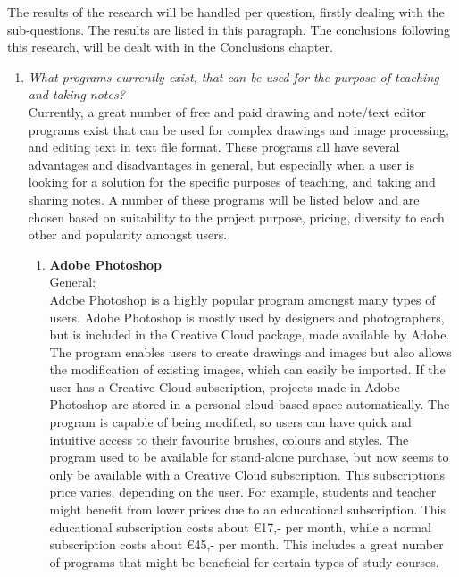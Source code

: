 \documentclass[a4paper,12pt]{article}
\begin{document}
The results of the research will be handled per question, firstly dealing with the sub-questions.
The results are listed in this paragraph. The conclusions following this research, will be dealt with in the Conclusions chapter.

\begin{enumerate}
\item \textit{What programs currently exist, that can be used for the purpose of teaching and taking notes?}\\
  Currently, a great number of free and paid drawing and note/text editor programs exist that can be used for complex drawings and image processing, and editing text in text file format. These programs all have several advantages and disadvantages in general, but especially when a user is looking for a solution for the specific purposes of teaching, and taking and sharing notes. A number of these programs will be listed below and are chosen based on suitability to the project purpose, pricing, diversity to each other and popularity amongst users.
  
  \begin{enumerate}
    
  \item \textbf{Adobe Photoshop}\\
    \underline{General:}\\
    Adobe Photoshop is a highly popular program amongst many types of users. Adobe Photoshop is mostly used by designers and photographers, but is included in the Creative Cloud package, made available by Adobe. The program enables users to create drawings and images but also allows the modification of existing images, which can easily be imported. If the user has a Creative Cloud subscription, projects made in Adobe Photoshop are stored in a personal cloud-based space automatically. The program is capable of being modified, so users can have quick and intuitive access to their favourite brushes, colours and styles. The program used to be available for stand-alone purchase, but now seems to only be available with a Creative Cloud subscription. This subscriptions price varies, depending on the user. For example, students and teacher might benefit from lower prices due to an educational subscription. This educational subscription costs about €17,- per month, while a normal subscription costs about €45,- per month. This includes a great number of programs that might be beneficial for certain types of study courses.\\


\end{enumerate}
\end{enumerate}
\end{document}
